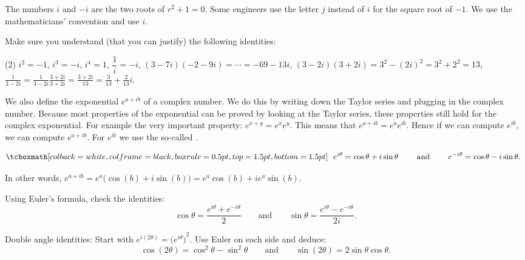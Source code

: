 The numbers
$i$ and $-i$ are the two roots of $r^2 + 1 = 0$.
Some engineers use the letter $j$ instead of $i$ for the square
root of $-1$.  We use the mathematicians' convention and use $i$.

\begin{exercise}
Make sure you understand (that you can justify)
the following identities:
\begin{tasks}(2)
\task $i^2 = -1$, $i^3 = -i$, $i^4 = 1$,
\task $\dfrac{1}{i} = -i$,
\task $(3-7i)(-2-9i) = \cdots = -69-13i$,
\task $(3-2i)(3+2i) = 3^2 - {(2i)}^2 = 3^2 + 2^2 = 13$,
\task $\frac{1}{3-2i} = \frac{1}{3-2i} \frac{3+2i}{3+2i} = \frac{3+2i}{13}
= \frac{3}{13}+\frac{2}{13}i$.
\end{tasks}
\end{exercise}

\pagebreak[2]
We also define the exponential $e^{a+ib}$ of a complex number.  We do
this by writing down the Taylor series and plugging in the complex
number.  Because most properties of the exponential can be proved by looking
at the Taylor series, these
properties still hold for the complex
exponential.  For example the very important property: $e^{x+y} = e^x e^y$.  This means that
$e^{a+ib} = e^a e^{ib}$.  Hence if we can compute $e^{ib}$, we can
compute $e^{a+ib}$.  For $e^{ib}$ we use the so-called
\emph{}.

\begin{theorem} \label{eulersformula}
\begin{equation*}
\mybxbg{~~
e^{i \theta} = \cos \theta + i \sin \theta
\qquad \text{ and } \qquad
e^{- i \theta} = \cos \theta - i \sin \theta .
~~}
\end{equation*}
\end{theorem}

In other words, $e^{a+ib} = e^a \bigl( \cos(b) + i \sin(b) \bigr) = e^a \cos(b) + i e^a \sin(b)$.

\begin{exercise}
Using Euler's formula, check the identities:
\begin{equation*}
\cos \theta = \frac{e^{i \theta} + e^{-i \theta}}{2}
\qquad \text{and} \qquad
\sin \theta = \frac{e^{i \theta} - e^{-i \theta}}{2i}.
\end{equation*}
\end{exercise}

\begin{exercise}
Double angle identities:
Start with $e^{i(2\theta)} = {\bigl(e^{i \theta} \bigr)}^2$.  Use Euler on
each side and deduce:
\begin{equation*}
\cos (2\theta) = \cos^2 \theta - \sin^2 \theta
\qquad \text{and} \qquad
\sin (2\theta) = 2 \sin \theta \cos \theta .
\end{equation*}
\end{exercise}

